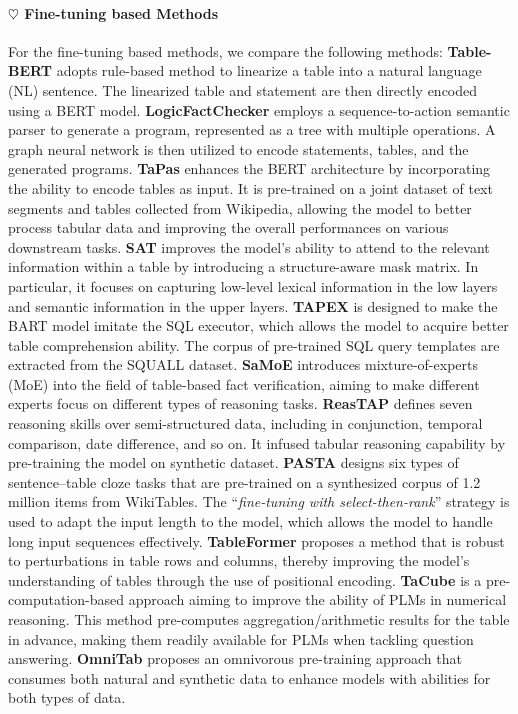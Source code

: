 \paragraph{$\heartsuit$ \textbf{Fine-tuning based Methods}} 
For the fine-tuning based methods, we compare the following methods:
\textbf{Table-BERT} \citep{tabfact} adopts rule-based method to linearize a table into a natural language (NL) sentence. The linearized table and statement are then directly encoded using a BERT model.
\textbf{LogicFactChecker} \citep{logicalfactchecker} employs a sequence-to-action semantic parser to generate a program, represented as a tree with multiple operations. A graph neural network is then utilized to encode statements, tables, and the generated programs.
\textbf{TaPas} \citep{tapas} enhances the BERT architecture by incorporating the ability to encode tables as input. It is pre-trained on a joint dataset of text segments and tables collected from Wikipedia, allowing the model to better process tabular data and improving the overall performances on various downstream tasks.
\textbf{SAT} \citep{sat} improves the model's ability to attend to the relevant information within a table by introducing a structure-aware mask matrix. In particular, it focuses on capturing low-level lexical information in the low layers and semantic information in the upper layers.
\textbf{TAPEX} \citep{tapex} is designed to make the BART model imitate the SQL executor, which allows the model to acquire better table comprehension ability. The corpus of pre-trained SQL query templates are extracted from the SQUALL dataset. 
\textbf{SaMoE} \citep{samoe} introduces mixture-of-experts (MoE) \citep{moesurvey} into the field of table-based fact verification, aiming to make different experts focus on different types of reasoning tasks. 
\textbf{ReasTAP} \citep{reastap} defines seven reasoning skills over semi-structured data, including in conjunction, temporal comparison, date difference, and so on. It infused tabular reasoning capability by pre-training the model on synthetic dataset.
\textbf{PASTA} \citep{pasta} designs six types of sentence–table cloze tasks that are pre-trained on a synthesized corpus of 1.2 million items from WikiTables. The ``\textit{fine-tuning with select-then-rank}'' strategy is used to adapt the input length to the model, which allows the model to handle long input sequences effectively. 
\textbf{TableFormer} \citep{tableformer} proposes a method that is robust to perturbations in table rows and columns, thereby improving the model's understanding of tables through the use of positional encoding.
\textbf{TaCube} \citep{tacube} is a pre-computation-based approach aiming to improve the ability of PLMs in numerical reasoning. This method pre-computes aggregation/arithmetic results for the table in advance, making them readily available for PLMs when tackling question answering.
\textbf{OmniTab} \citep{omnitab} proposes an omnivorous pre-training approach that consumes both natural and synthetic data to enhance models with abilities for both types of data.

